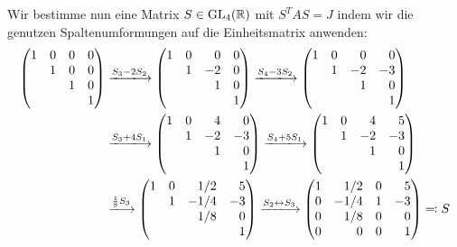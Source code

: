 Wir bestimme nun eine Matrix $S \in \operatorname{GL}_{4}(\mathbb{R}) $ mit $S^T A S = J$ indem wir die genutzen Spaltenumformungen auf die Einheitsmatrix anwenden:
\begingroup
\allowdisplaybreaks
\begin{align*}
  \begin{pmatrix*}[r]
    1 & 0 & 0 & 0 \\
      & 1 & 0 & 0 \\
      &   & 1 & 0  \\
      &   &   & 1
  \end{pmatrix*}
  &\xlongrightarrow{S_3 - 2 S_2}
  \begin{pmatrix*}[r]
    1 & 0 &  0  & 0 \\
      & 1 & -2  & 0 \\
      &   &  1  & 0  \\
      &   &     & 1
  \end{pmatrix*}
  \xlongrightarrow{S_4 - 3 S_2}
  \begin{pmatrix*}[r]
    1 & 0 &  0  &  0  \\
      & 1 & -2  & -3  \\
      &   &  1  &  0  \\
      &   &     &  1
  \end{pmatrix*}
  \\
  &\xlongrightarrow{S_3 + 4 S_1}
  \begin{pmatrix*}[r]
    1 & 0 &  4  &  0  \\
      & 1 & -2  & -3  \\
      &   &  1  &  0  \\
      &   &     &  1
  \end{pmatrix*}
  \xlongrightarrow{S_4 + 5 S_1}
  \begin{pmatrix*}[r]
    1  & 0 &  4 &  5  \\
       & 1 & -2 & -3  \\
       &   &  1 &  0  \\
       &   &    &  1
  \end{pmatrix*}
  \\
  &\xlongrightarrow{\frac{1}{8} S_3}
  \begin{pmatrix*}[r]
    1 & 0 &  1/2 &  5  \\
      & 1 & -1/4 & -3  \\
      &   &  1/8 &  0  \\
      &   &      &  1
  \end{pmatrix*}
  \xlongrightarrow{S_2 \leftrightarrow S_3}
  \begin{pmatrix*}[r]
    1 &  1/2  & 0 &  5  \\
    0 & -1/4  & 1 & -3  \\
    0 &  1/8  & 0 &  0  \\
    0 &  0    & 0 &  1
  \end{pmatrix*}
  \eqqcolon
  S
\end{align*}
\endgroup




